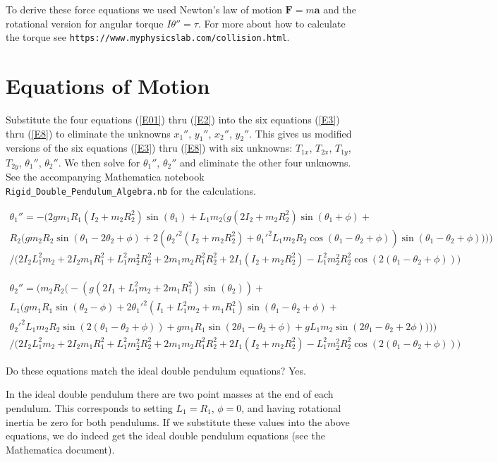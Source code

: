 \documentclass[draft]{article}
\begin{document}
To derive these force equations we used Newton's law of motion $\mathbf{F} = m \mathbf{a}$ and the rotational version for angular torque $I \theta'' = \tau$.  For more about how to calculate the torque see \texttt{https://www.myphysicslab.com/collision.html}.

\section{Equations of Motion}

Substitute the four equations (\ref{E01}) thru (\ref{E2}) into the six equations (\ref{E3}) thru (\ref{E8}) to eliminate the unknowns $x_1''$, $y_1''$, $x_2''$, $y_2''$.  This gives us modified versions of the six equations (\ref{E3}) thru (\ref{E8}) with  six unknowns: $T_{1x}$, $T_{2x}$,  $T_{1y}$, $T_{2y}$, $\theta_1''$,  $\theta_2''$.  We then solve for $\theta_1''$, $\theta_2''$ and eliminate the other four unknowns.  See the accompanying Mathematica notebook \texttt{Rigid\_Double\_Pendulum\_Algebra.nb} for the calculations.

\small
\begin{multline}
\theta_1'' = -\Big(2 g m_1 R_1 (I_2 + m_2 R_2^2) \sin(\theta_1) + L_1 m_2 \Big(g (2 I_2 + m_2 R_2^2) \sin(\theta_1 + \phi) + \\
R_2 \Big(g m_2 R_2 \sin(\theta_1 - 2 \theta_2 + \phi) + 2 (\theta_2'^2 (I_2 + m_2 R_2^2) +
\theta_1'^2 L_1 m_2 R_2 \cos(\theta_1 - \theta_2 + \phi)) \sin(\theta_1 - \theta_2 + \phi)
\Big)\Big)\Big)\\
\Big/
\Big(2 I_2 L_1^2 m_2 + 2 I_2 m_1 R_1^2 + 
L_1^2 m_2^2 R_2^2 + 2 m_1 m_2 R_1^2 R_2^2 + 2 I_1 (I_2 + m_2 R_2^2) - 
L_1^2 m_2^2 R_2^2 \cos(2 (\theta_1 - \theta_2 + \phi))\Big) 
\end{multline}

\begin{multline}
\theta_2'' = \Big(m_2 R_2 \Big(-(g (2 I_1 + L_1^2 m_2 + 2 m_1 R_1^2) \sin(\theta_2)) + \\
L_1 \Big(g m_1 R_1 \sin(\theta_2 - \phi) + 2 \theta_1'^2 (I_1 + L_1^2 m_2 + m_1 R_1^2) \sin(\theta_1 - \theta_2 + \phi) + \\
\theta_2'^2 L_1 m_2 R_2 \sin(2 (\theta_1 - \theta_2 + \phi)) + g m_1 R_1 \sin(2 \theta_1 - \theta_2 + \phi) + 
g L_1 m_2 \sin(2 \theta_1 - \theta_2 + 2 \phi)\Big)\Big)\Big)\\
\Big/
\Big(2 I_2 L_1^2 m_2 + 2 I_2 m_1 R_1^2 + L_1^2 m_2^2 R_2^2 + 
2 m_1 m_2 R_1^2 R_2^2 + 2 I_1 (I_2 + m_2 R_2^2) - L_1^2 m_2^2 R_2^2 \cos(2 (\theta_1 - \theta_2 + \phi))\Big)
\end{multline}

Do these equations match the ideal double pendulum equations? Yes.

In the ideal double pendulum there are two point masses at the end of each pendulum.  This corresponds to setting $L_1=R_1$, $\phi=0$, and having rotational inertia be zero for both pendulums.  If we substitute these values into the above equations, we do indeed get the ideal double pendulum equations (see the Mathematica document).
\end{document}

